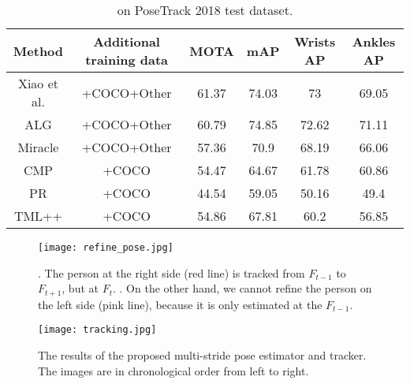 \documentclass[conference]{IEEEtran}
\begin{document}
\begin{table}[t!]
  \centering
  \caption{ on PoseTrack 2018 test dataset.}
    \begin{adjustbox}{width=1\linewidth}

    \begin{tabular}[width=\linewidth]{c|c|c|c|c|c}
    \toprule
    Method & Additional training data & MOTA  & mAP   & Wrists AP & Ankles AP \\
    \midrule
    \midrule
    Xiao et al. \cite{xiao2018simple} & +COCO+Other      & 61.37 & 74.03 & 73    & 69.05 \\
    \midrule
    ALG   & +COCO+Other      & 60.79 & 74.85 & 72.62 & 71.11 \\
    \midrule
    Miracle & +COCO+Other      & 57.36 & 70.9  & 68.19 & 66.06 \\
    \midrule
    CMP   & +COCO       & 54.47 & 64.67 & 61.78 & 60.86 \\
    \midrule
    PR    & +COCO       & 44.54 & 59.05 & 50.16 & 49.4 \\
    \midrule
    TML++  & +COCO       & 54.86 & 67.81 & 60.2  & 56.85 \\
    \bottomrule
    \end{tabular}\end{adjustbox}
  \label{tab:comp_other2018}\end{table}


\begin{figure*}[t!]
\centering
  \texttt{[image: refine\_pose.jpg]}
  \caption{. The person at the right side  (red line) is tracked from $F_{t-1}$ to $F_{t+1}$, but  at $F_t$. . On the other hand, we cannot refine the person on the left side (pink line), because it is only estimated at the $F_{t-1}$.
 }
  \label{fig:refine}
\end{figure*}


\begin{figure*}[t!]
\centering
  \texttt{[image: tracking.jpg]}
  \caption{The  results of the proposed multi-stride pose estimator and tracker. The images are in chronological order from left to right. }
  \label{fig:tracking}
\end{figure*}
\end{document}
